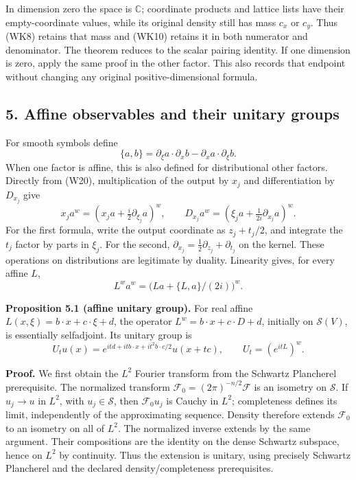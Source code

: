 \documentclass[
  11pt,
]{article}
\begin{document}
In dimension zero the space is \(\mathbb C\); coordinate products and
lattice lists have their empty-coordinate values, while its original
density still has mass \(c_x\) or \(c_y\). Thus (WK8) retains that mass
and (WK10) retains it in both numerator and denominator. The theorem
reduces to the scalar pairing identity. If one dimension is zero, apply
the same proof in the other factor. This also records that endpoint
without changing any original positive-dimensional formula.

\subsection{5. Affine observables and their unitary
groups}\label{affine-observables-and-their-unitary-groups}

For smooth symbols define \[
\{a,b\}=\partial_\xi a\cdot\partial_xb-
\partial_xa\cdot\partial_\xi b.
\tag{W22}
\] When one factor is affine, this is also defined for distributional
other factors. Directly from (W20), multiplication of the output by
\(x_j\) and differentiation by \(D_{x_j}\) give \[
x_j a^w=(x_ja+\tfrac i2\partial_{\xi_j}a)^w,
\qquad
D_{x_j}a^w=(\xi_ja+\tfrac1{2i}\partial_{x_j}a)^w.
\] For the first formula, write the output coordinate as \(z_j+t_j/2\),
and integrate the \(t_j\) factor by parts in \(\xi_j\). For the second,
\(\partial_{x_j}=\frac12\partial_{z_j}+\partial_{t_j}\) on the kernel.
These operations on distributions are legitimate by duality. Linearity
gives, for every affine \(L\), \[
L^w a^w=\big(La+\{L,a\}/(2i)\big)^w.
\tag{W23}
\]

\textbf{Proposition 5.1 (affine unitary group).} For real affine
\(L(x,\xi)=b\cdot x+c\cdot\xi+d\), the operator
\(L^w=b\cdot x+c\cdot D+d\), initially on \(\mathcal S(V)\), is
essentially selfadjoint. Its unitary group is \[
U_tu(x)=e^{itd+it b\cdot x+it^2 b\cdot c/2}u(x+tc),
\qquad U_t=(e^{itL})^w.
\tag{W24}
\]

\textbf{Proof.} We first obtain the \(L^2\) Fourier transform from the
Schwartz Plancherel prerequisite. The normalized transform
\(\mathcal F_0=(2\pi)^{-n/2}\mathcal F\) is an isometry on
\(\mathcal S\). If \(u_j\to u\) in \(L^2\), with \(u_j\in\mathcal S\),
then \(\mathcal F_0u_j\) is Cauchy in \(L^2\); completeness defines its
limit, independently of the approximating sequence. Density therefore
extends \(\mathcal F_0\) to an isometry on all of \(L^2\). The
normalized inverse extends by the same argument. Their compositions are
the identity on the dense Schwartz subspace, hence on \(L^2\) by
continuity. Thus the extension is unitary, using precisely Schwartz
Plancherel and the declared density/completeness prerequisites.
\end{document}

